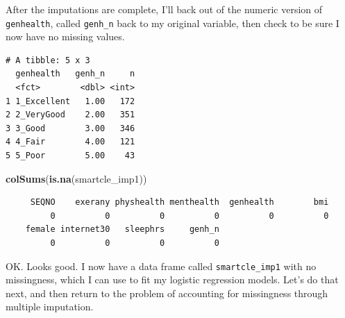 \documentclass[]{book}
\newenvironment{Shaded}{\begin{snugshade}}{\end{snugshade}}
\newcommand{\KeywordTok}[1]{\textcolor[rgb]{0.13,0.29,0.53}{\textbf{#1}}}
\newcommand{\DataTypeTok}[1]{\textcolor[rgb]{0.13,0.29,0.53}{#1}}
\newcommand{\StringTok}[1]{\textcolor[rgb]{0.31,0.60,0.02}{#1}}
\newcommand{\OperatorTok}[1]{\textcolor[rgb]{0.81,0.36,0.00}{\textbf{#1}}}
\newcommand{\NormalTok}[1]{#1}
\theoremstyle{definition}
\theoremstyle{definition}
\theoremstyle{definition}
\theoremstyle{remark}
\begin{document}
After the imputations are complete, I'll back out of the numeric version
of \texttt{genhealth}, called \texttt{genh\_n} back to my original
variable, then check to be sure I now have no missing values.

\begin{Shaded}
\end{Shaded}

\begin{verbatim}
# A tibble: 5 x 3
  genhealth   genh_n     n
  <fct>        <dbl> <int>
1 1_Excellent   1.00   172
2 2_VeryGood    2.00   351
3 3_Good        3.00   346
4 4_Fair        4.00   121
5 5_Poor        5.00    43
\end{verbatim}

\begin{Shaded}
\begin{Highlighting}[]
\KeywordTok{colSums}\NormalTok{(}\KeywordTok{is.na}\NormalTok{(smartcle_imp1))}
\end{Highlighting}
\end{Shaded}

\begin{verbatim}
     SEQNO    exerany physhealth menthealth  genhealth        bmi 
         0          0          0          0          0          0 
    female internet30   sleephrs     genh_n 
         0          0          0          0 
\end{verbatim}

OK. Looks good. I now have a data frame called \texttt{smartcle\_imp1}
with no missingness, which I can use to fit my logistic regression
models. Let's do that next, and then return to the problem of accounting
for missingness through multiple imputation.
\end{document}
